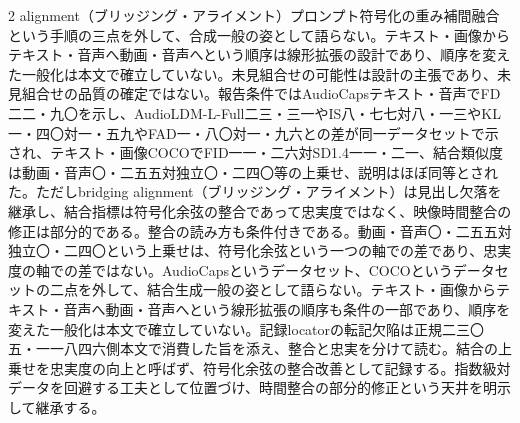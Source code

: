 \documentclass[lualatex,a4paper,10pt]{jlreq}
\begin{document}
\begin{multicols}{2}
alignment（ブリッジング・アライメント）プロンプト符号化の重み補間融合という手順の三点を外して、合成一般の姿として語らない。テキスト・画像からテキスト・音声へ動画・音声へという順序は線形拡張の設計であり、順序を変えた一般化は本文で確立していない。未見組合せの可能性は設計の主張であり、未見組合せの品質の確定ではない\autocite{btd097}。報告条件ではAudioCapsテキスト・音声でFD二二・九〇を示し、AudioLDM-L-Full二三・三一やIS八・七七対八・一三やKL一・四〇対一・五九やFAD一・八〇対一・九六との差が同一データセットで示され、テキスト・画像COCOでFID一一・二六対SD1.4一一・二一、結合類似度は動画・音声〇・二五五対独立〇・二四〇等の上乗せ、説明はほぼ同等とされた\autocite{btd097}。ただしbridging alignment（ブリッジング・アライメント）は見出し欠落を継承し、結合指標は符号化余弦の整合であって忠実度ではなく、映像時間整合の修正は部分的である\autocite{btd097}。整合の読み方も条件付きである。動画・音声〇・二五五対独立〇・二四〇という上乗せは、符号化余弦という一つの軸での差であり、忠実度の軸での差ではない。AudioCapsというデータセット、COCOというデータセットの二点を外して、結合生成一般の姿として語らない。テキスト・画像からテキスト・音声へ動画・音声へという線形拡張の順序も条件の一部であり、順序を変えた一般化は本文で確立していない\autocite{btd097}。記録locatorの転記欠陥は正規二三〇五・一一八四六側本文で消費した旨を添え、整合と忠実を分けて読む。結合の上乗せを忠実度の向上と呼ばず、符号化余弦の整合改善として記録する。指数級対データを回避する工夫として位置づけ、時間整合の部分的修正という天井を明示して継承する。


\end{multicols}
\end{document}
